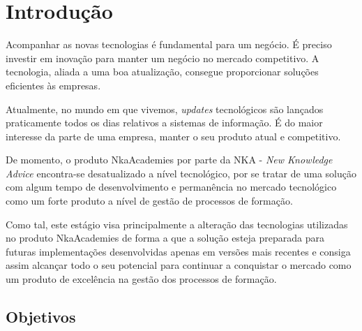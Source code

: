
\chapter{Introdução}


Acompanhar as novas tecnologias é fundamental para um negócio. É preciso investir em inovação para manter um negócio no mercado competitivo. A tecnologia, aliada a uma boa atualização, consegue proporcionar soluções eficientes às empresas.

Atualmente, no mundo em que vivemos, \textit{updates} tecnológicos são lançados praticamente todos os dias relativos a sistemas de informação. É do maior interesse da parte de uma empresa, manter o seu produto atual e competitivo.

De momento, o produto NkaAcademies por parte da NKA - \textit{New Knowledge Advice} encontra-se desatualizado a nível tecnológico, por se tratar de uma solução com algum tempo de desenvolvimento e permanência no mercado tecnológico como um forte produto a nível de gestão de processos de formação. 

Como tal, este estágio visa principalmente a alteração das tecnologias utilizadas no produto NkaAcademies de forma a que a solução esteja preparada para futuras implementações desenvolvidas apenas em versões mais recentes e consiga assim alcançar todo o seu potencial para continuar a conquistar o mercado como um produto de excelência na gestão dos processos de formação.



\section{Objetivos}


